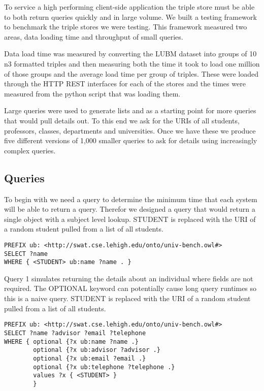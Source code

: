 \documentclass{llncs}
\begin{document}
To service a high performing client-side application the triple store must be able to both return queries quickly and in large volume.  We built a testing framework to benchmark the triple stores we were testing.  This framework measured two areas, data loading time and throughput of small queries.

Data load time was measured by converting the LUBM dataset into groups of 10 n3 formatted triples and then measuring both the time it took to load one million of those groups and the average load time per group of triples.  These were loaded through the HTTP REST interfaces for each of the stores and the times were measured from the python script that was loading them.

Large queries were used to generate lists and as a starting point for more queries that would pull details out.  To this end we ask for the URIs of all students, professors, classes, departments and universities.  Once we have these we produce five different versions of 1,000 smaller queries to ask for details using increasingly complex queries.

\subsection{Queries}
To begin with we need a query to determine the minimum time that each system will be able to return a query.  Therefor we designed a query that would return a single object with a subject level lookup.  STUDENT is replaced with the URI of a random student pulled from a list of all students.

\begin{lstlisting}[caption=Benchmark Query]
PREFIX ub: <http://swat.cse.lehigh.edu/onto/univ-bench.owl#>
SELECT ?name
WHERE { <STUDENT> ub:name ?name . }
\end{lstlisting}

\smallskip

Query 1 simulates returning the details about an individual where fields are not required.  The OPTIONAL keyword can potentially cause long query runtimes so this is a naive query.  STUDENT is replaced with the URI of a random student pulled from a list of all students.

\begin{lstlisting}[caption=Query 1]
PREFIX ub: <http://swat.cse.lehigh.edu/onto/univ-bench.owl#>
SELECT ?name ?advisor ?email ?telephone
WHERE { optional {?x ub:name ?name .}
        optional {?x ub:advisor ?advisor .}
        optional {?x ub:email ?email .}
        optional {?x ub:telephone ?telephone .}
        values ?x { <STUDENT> }
        }
\end{lstlisting}
\end{document}
